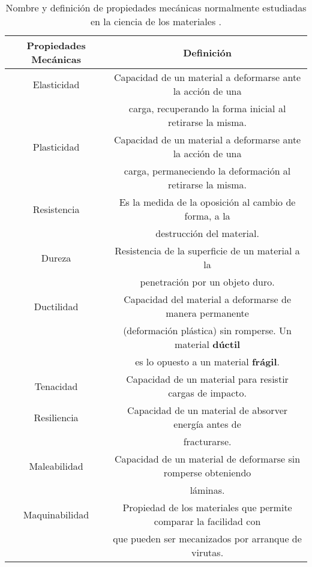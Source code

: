 \begin{table}[htp]
\caption[Nombre y definición de propiedades mecánicas.]{Nombre y definición de propiedades mecánicas normalmente estudiadas en la ciencia de los materiales
\citep{askeland98}.}
\begin{center}
\begin{tabular}{*{2}{c}}
\hline
\textbf{Propiedades Mecánicas} & \textbf{Definición} \\ \hline
 \hline

Elasticidad &
Capacidad de un material a deformarse ante la acción de una\\
& carga, recuperando la forma inicial al retirarse la misma. \\ \hline
 
Plasticidad &
Capacidad de un material a deformarse ante la acción de una\\
& carga, permaneciendo la deformación al retirarse la misma. \\ \hline 
 
Resistencia & 
Es la medida de la oposición al cambio de forma, a la \\
& destrucción del material. \\ \hline

Dureza & 
Resistencia de la superficie de un material a la\\
& penetración por un objeto duro.\\ \hline

Ductilidad & 
Capacidad del material a deformarse de manera permanente\\
& (deformación plástica) sin romperse. Un material \textbf{dúctil} \\
& es lo opuesto a un material \textbf{frágil}. \\ \hline

Tenacidad & 
Capacidad de un material para resistir cargas de impacto. \\ \hline

Resiliencia &
Capacidad de un material de absorver energía antes de \\
& fracturarse. \\ \hline

Maleabilidad & 
Capacidad de un material de deformarse sin romperse obteniendo \\
& láminas. \\ \hline

Maquinabilidad &
Propiedad de los materiales que permite comparar la facilidad con \\
& que pueden ser mecanizados por arranque de virutas. \\ \hline


\end{tabular}
\end{center}
\end{table}

